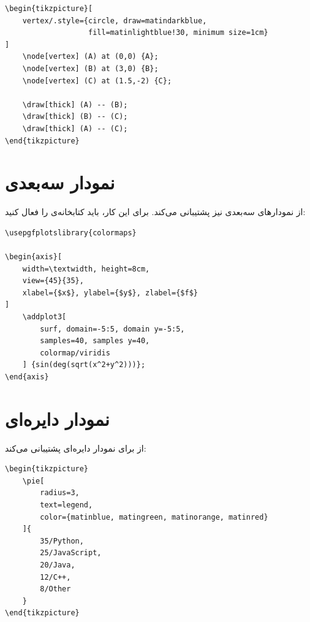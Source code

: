 \begin{latin}
\begin{verbatim}
\begin{tikzpicture}[
    vertex/.style={circle, draw=matindarkblue,
                   fill=matinlightblue!30, minimum size=1cm}
]
    \node[vertex] (A) at (0,0) {A};
    \node[vertex] (B) at (3,0) {B};
    \node[vertex] (C) at (1.5,-2) {C};

    \draw[thick] (A) -- (B);
    \draw[thick] (B) -- (C);
    \draw[thick] (A) -- (C);
\end{tikzpicture}
\end{verbatim}
\end{latin}


\section{نمودار سه‌بعدی}
\label{sec:graphics-3d}

 از نمودارهای سه‌بعدی نیز پشتیبانی
می‌کند. برای این کار، باید کتابخانه‌ی
 را فعال کنید:

\begin{latin}
\begin{verbatim}
\usepgfplotslibrary{colormaps}

\begin{axis}[
    width=\textwidth, height=8cm,
    view={45}{35},
    xlabel={$x$}, ylabel={$y$}, zlabel={$f$}
]
    \addplot3[
        surf, domain=-5:5, domain y=-5:5,
        samples=40, samples y=40,
        colormap/viridis
    ] {sin(deg(sqrt(x^2+y^2)))};
\end{axis}
\end{verbatim}
\end{latin}


\section{نمودار دایره‌ای}
\label{sec:graphics-pie}

 از  برای نمودار
دایره‌ای پشتیبانی می‌کند:

\begin{latin}
\begin{verbatim}
\begin{tikzpicture}
    \pie[
        radius=3,
        text=legend,
        color={matinblue, matingreen, matinorange, matinred}
    ]{
        35/Python,
        25/JavaScript,
        20/Java,
        12/C++,
        8/Other
    }
\end{tikzpicture}
\end{verbatim}
\end{latin}

